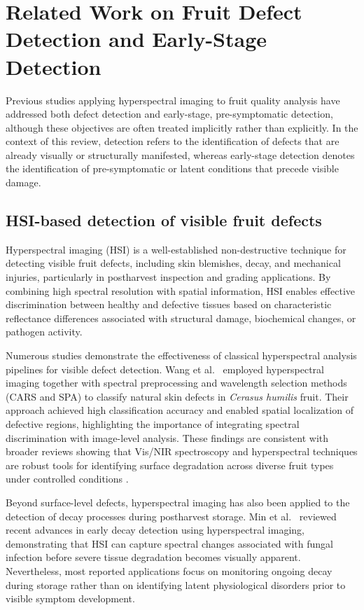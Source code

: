 \section{Related Work on Fruit Defect Detection and Early-Stage Detection}
\label{sec:related_work}

\noindent
Previous studies applying hyperspectral imaging to fruit quality analysis have addressed both defect detection and early-stage, pre-symptomatic detection, although these objectives are often treated implicitly rather than explicitly. In the context of this review, detection refers to the identification of defects that are already visually or structurally manifested, whereas early-stage detection denotes the identification of pre-symptomatic or latent conditions that precede visible damage.

\subsection{HSI-based detection of visible fruit defects}

\noindent
Hyperspectral imaging (HSI) is a well-established non-destructive technique for detecting
visible fruit defects, including skin blemishes, decay, and mechanical injuries, particularly
in postharvest inspection and grading applications. By combining high spectral resolution
with spatial information, HSI enables effective discrimination between healthy and defective
tissues based on characteristic reflectance differences associated with structural damage,
biochemical changes, or pathogen activity.

\medskip
\noindent
Numerous studies demonstrate the effectiveness of classical hyperspectral analysis pipelines
for visible defect detection. Wang et al.~\cite{app13053279} employed hyperspectral imaging
together with spectral preprocessing and wavelength selection methods (CARS and SPA)
to classify natural skin defects in \textit{Cerasus humilis} fruit. Their approach achieved high
classification accuracy and enabled spatial localization of defective regions, highlighting
the importance of integrating spectral discrimination with image-level analysis. These
findings are consistent with broader reviews showing that Vis/NIR spectroscopy and
hyperspectral techniques are robust tools for identifying surface degradation across diverse
fruit types under controlled conditions \cite{agriculture15202167}.

\medskip
\noindent
Beyond surface-level defects, hyperspectral imaging has also been applied to the detection
of decay processes during postharvest storage. Min et al.~\cite{min2023decay} reviewed
recent advances in early decay detection using hyperspectral imaging, demonstrating that
HSI can capture spectral changes associated with fungal infection before severe tissue
degradation becomes visually apparent. Nevertheless, most reported applications focus on
monitoring ongoing decay during storage rather than on identifying latent physiological
disorders prior to visible symptom development.

